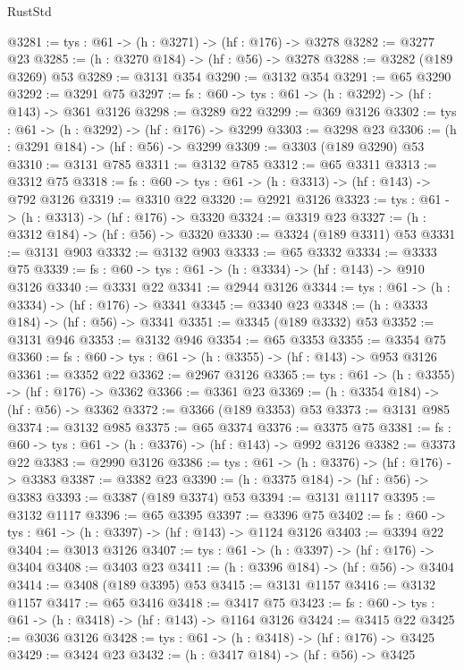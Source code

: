 \begin{lexlean}{RustStd}
\begin{coremodule}
@3281 := {tys : @61} -> (h : @3271) -> (hf : @176) -> @3278
@3282 := @3277 @23
@3285 := (h : @3270 @184) -> (hf : @56) -> @3278
@3288 := @3282 (@189 @3269) @53
@3289 := @3131 @354
@3290 := @3132 @354
@3291 := @65 @3290
@3292 := @3291 @75
@3297 := {fs : @60} -> {tys : @61} -> (h : @3292) -> (hf : @143) -> @361 @3126
@3298 := @3289 @22
@3299 := @369 @3126
@3302 := {tys : @61} -> (h : @3292) -> (hf : @176) -> @3299
@3303 := @3298 @23
@3306 := (h : @3291 @184) -> (hf : @56) -> @3299
@3309 := @3303 (@189 @3290) @53
@3310 := @3131 @785
@3311 := @3132 @785
@3312 := @65 @3311
@3313 := @3312 @75
@3318 := {fs : @60} -> {tys : @61} -> (h : @3313) -> (hf : @143) -> @792 @3126
@3319 := @3310 @22
@3320 := @2921 @3126
@3323 := {tys : @61} -> (h : @3313) -> (hf : @176) -> @3320
@3324 := @3319 @23
@3327 := (h : @3312 @184) -> (hf : @56) -> @3320
@3330 := @3324 (@189 @3311) @53
@3331 := @3131 @903
@3332 := @3132 @903
@3333 := @65 @3332
@3334 := @3333 @75
@3339 := {fs : @60} -> {tys : @61} -> (h : @3334) -> (hf : @143) -> @910 @3126
@3340 := @3331 @22
@3341 := @2944 @3126
@3344 := {tys : @61} -> (h : @3334) -> (hf : @176) -> @3341
@3345 := @3340 @23
@3348 := (h : @3333 @184) -> (hf : @56) -> @3341
@3351 := @3345 (@189 @3332) @53
@3352 := @3131 @946
@3353 := @3132 @946
@3354 := @65 @3353
@3355 := @3354 @75
@3360 := {fs : @60} -> {tys : @61} -> (h : @3355) -> (hf : @143) -> @953 @3126
@3361 := @3352 @22
@3362 := @2967 @3126
@3365 := {tys : @61} -> (h : @3355) -> (hf : @176) -> @3362
@3366 := @3361 @23
@3369 := (h : @3354 @184) -> (hf : @56) -> @3362
@3372 := @3366 (@189 @3353) @53
@3373 := @3131 @985
@3374 := @3132 @985
@3375 := @65 @3374
@3376 := @3375 @75
@3381 := {fs : @60} -> {tys : @61} -> (h : @3376) -> (hf : @143) -> @992 @3126
@3382 := @3373 @22
@3383 := @2990 @3126
@3386 := {tys : @61} -> (h : @3376) -> (hf : @176) -> @3383
@3387 := @3382 @23
@3390 := (h : @3375 @184) -> (hf : @56) -> @3383
@3393 := @3387 (@189 @3374) @53
@3394 := @3131 @1117
@3395 := @3132 @1117
@3396 := @65 @3395
@3397 := @3396 @75
@3402 := {fs : @60} -> {tys : @61} -> (h : @3397) -> (hf : @143) -> @1124 @3126
@3403 := @3394 @22
@3404 := @3013 @3126
@3407 := {tys : @61} -> (h : @3397) -> (hf : @176) -> @3404
@3408 := @3403 @23
@3411 := (h : @3396 @184) -> (hf : @56) -> @3404
@3414 := @3408 (@189 @3395) @53
@3415 := @3131 @1157
@3416 := @3132 @1157
@3417 := @65 @3416
@3418 := @3417 @75
@3423 := {fs : @60} -> {tys : @61} -> (h : @3418) -> (hf : @143) -> @1164 @3126
@3424 := @3415 @22
@3425 := @3036 @3126
@3428 := {tys : @61} -> (h : @3418) -> (hf : @176) -> @3425
@3429 := @3424 @23
@3432 := (h : @3417 @184) -> (hf : @56) -> @3425

\end{coremodule}
\end{lexlean}
